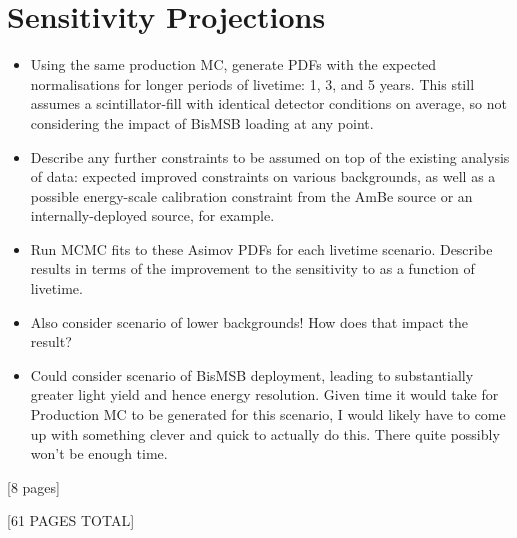 {    \section{Sensitivity Projections}
    \begin{itemize}
        \item Using the same production MC, generate PDFs with the expected normalisations for longer periods of livetime: 1, 3, and 5 years. This still assumes a scintillator-fill with identical detector conditions on average, so not considering the impact of BisMSB loading at any point.
        \item Describe any further constraints to be assumed on top of the existing analysis of data: expected improved constraints on various backgrounds, as well as a possible energy-scale calibration constraint from the AmBe source or an internally-deployed source, for example.
        \item Run MCMC fits to these Asimov PDFs for each livetime scenario. Describe results in terms of the improvement to the sensitivity to \tonetwo{} as a function of livetime.
        \item Also consider scenario of lower backgrounds! How does that impact the result?
        \item Could consider scenario of BisMSB deployment, leading to substantially greater light yield and hence energy resolution. Given time it would take for Production MC to be generated for this scenario, I would likely have to come up with something clever and quick to actually do this. There quite possibly won't be enough time.
    \end{itemize}
    [8 pages]

    [61 PAGES TOTAL]
}